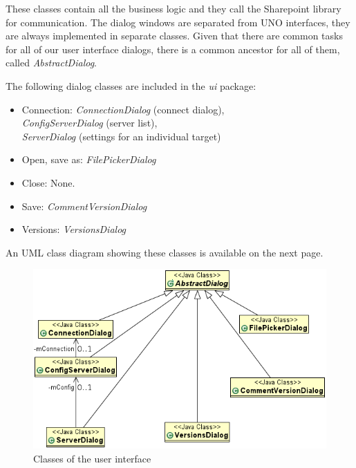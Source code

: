 These classes contain all the business logic and they call the Sharepoint
library for communication. The dialog windows are separated from UNO
interfaces, they are always implemented in separate classes. Given that there
are common tasks for all of our user interface dialogs, there is a common
ancestor for all of them, called \emph{AbstractDialog}.

The following dialog classes are included in the \emph{ui} package:

\begin{itemize}
\item Connection: \emph{ConnectionDialog} (connect dialog), \\
\emph{ConfigServerDialog} (server list), \\ \emph{ServerDialog} (settings for an
individual target)
\item Open, save as: \emph{FilePickerDialog}
\item Close: None.
\item Save: \emph{CommentVersionDialog}
\item Versions: \emph{VersionsDialog}
\end{itemize}

An UML class diagram showing these classes is available on the next page.

\begin{figure}[p]
\centering
\includegraphics[width=425px,keepaspectratio]{design-spui.png}
\caption{Classes of the user interface}
\end{figure}

